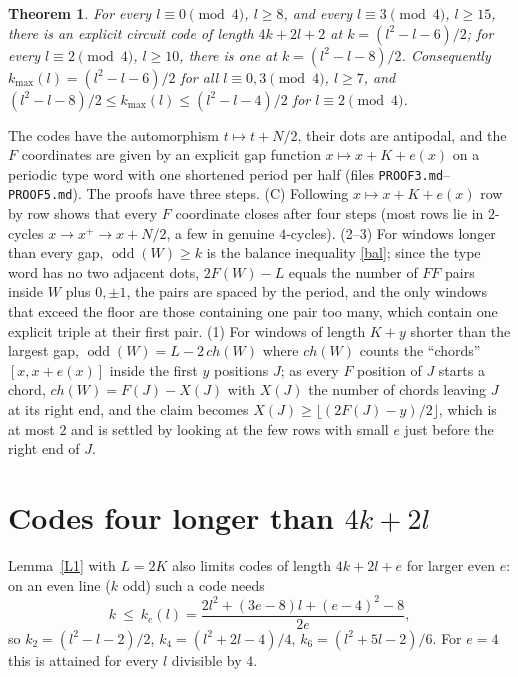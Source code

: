 \documentclass[11pt]{article}
\newtheorem{theorem}{Theorem}
\theoremstyle{remark}
\newcommand{\odd}{\operatorname{odd}}
\begin{document}
\begin{theorem}\label{fams}
For every $l\equiv 0\pmod 4$, $l\ge 8$, and every $l\equiv 3\pmod 4$, $l\ge 15$, there is an explicit circuit code of length $4k+2l+2$
at $k=(l^2-l-6)/2$; for every $l\equiv 2\pmod 4$, $l\ge 10$, there is one at $k=(l^2-l-8)/2$. Consequently
$k_{\max}(l)=(l^2-l-6)/2$ for all $l\equiv 0,3\pmod 4$, $l\ge 7$, and $(l^2-l-8)/2\le k_{\max}(l)\le (l^2-l-4)/2$ for $l\equiv 2\pmod 4$.
\end{theorem}
\noindent The codes have the automorphism $t\mapsto t+N/2$, their dots are antipodal, and the $F$ coordinates are given by an explicit
gap function $x\mapsto x+K+e(x)$ on a periodic type word with one shortened period per half (files \texttt{PROOF3.md}--\texttt{PROOF5.md}).
The proofs have three steps. (C) Following $x\mapsto x+K+e(x)$ row by row shows that every $F$ coordinate closes after four steps
(most rows lie in $2$-cycles $x\to x^+\to x+N/2$, a few in genuine $4$-cycles). (2--3) For windows longer than every gap,
$\odd(W)\ge k$ is the balance inequality \eqref{bal}; since the type word has no two adjacent dots, $2F(W)-L$ equals the number of
$FF$ pairs inside $W$ plus $0,\pm1$, the pairs are spaced by the period, and the only windows that exceed the floor are those
containing one pair too many, which contain one explicit triple at their first pair. (1) For windows of length $K+y$ shorter than
the largest gap, $\odd(W)=L-2\,ch(W)$ where $ch(W)$ counts the ``chords'' $[x,x+e(x)]$ inside the first $y$ positions $J$; as every
$F$ position of $J$ starts a chord, $ch(W)=F(J)-X(J)$ with $X(J)$ the number of chords leaving $J$ at its right end, and the claim
becomes $X(J)\ge\lfloor (2F(J)-y)/2\rfloor$, which is at most $2$ and is settled by looking at the few rows with small $e$ just before
the right end of $J$.


\section{Codes four longer than $4k+2l$}\label{sec:four}
Lemma~\ref{L1} with $L=2K$ also limits codes of length $4k+2l+e$ for larger even $e$: on an even line ($k$ odd) such a code needs
\[ k\ \le\ k_e(l)=\frac{2l^2+(3e-8)l+(e-4)^2-8}{2e}, \]
so $k_2=(l^2-l-2)/2$, $k_4=(l^2+2l-4)/4$, $k_6=(l^2+5l-2)/6$. For $e=4$ this is attained for every $l$ divisible by $4$.
\end{document}
